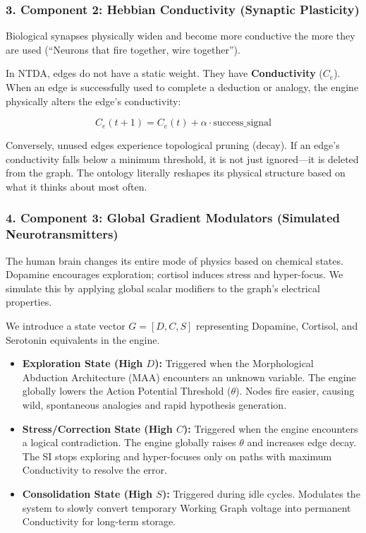 \documentclass[
  11pt,
  a4paper,
]{article}
\providecommand{\tightlist}{%
  \setlength{\itemsep}{0pt}\setlength{\parskip}{0pt}}
\begin{document}
\subsubsection{3. Component 2: Hebbian Conductivity (Synaptic
Plasticity)}\label{component-2-hebbian-conductivity-synaptic-plasticity}

Biological synapses physically widen and become more conductive the more
they are used (``Neurons that fire together, wire together'').

In NTDA, edges do not have a static weight. They have
\textbf{Conductivity} (\(C_{e}\)). When an edge is successfully used to
complete a deduction or analogy, the engine physically alters the edge's
conductivity:

\[ C_e(t+1) = C_e(t) + \alpha \cdot \text{success\_signal} \]

Conversely, unused edges experience topological pruning (decay). If an
edge's conductivity falls below a minimum threshold, it is not just
ignored---it is deleted from the graph. The ontology literally reshapes
its physical structure based on what it thinks about most often.

\subsubsection{4. Component 3: Global Gradient Modulators (Simulated
Neurotransmitters)}\label{component-3-global-gradient-modulators-simulated-neurotransmitters}

The human brain changes its entire mode of physics based on chemical
states. Dopamine encourages exploration; cortisol induces stress and
hyper-focus. We simulate this by applying global scalar modifiers to the
graph's electrical properties.

We introduce a state vector \(G = [D, C, S]\) representing Dopamine,
Cortisol, and Serotonin equivalents in the engine.

\begin{itemize}
\tightlist
\item
  \textbf{Exploration State (High \(D\)):} Triggered when the
  Morphological Abduction Architecture (MAA) encounters an unknown
  variable. The engine globally lowers the Action Potential Threshold
  (\(\theta\)). Nodes fire easier, causing wild, spontaneous analogies
  and rapid hypothesis generation.
\item
  \textbf{Stress/Correction State (High \(C\)):} Triggered when the
  engine encounters a logical contradiction. The engine globally raises
  \(\theta\) and increases edge decay. The SI stops exploring and
  hyper-focuses only on paths with maximum Conductivity to resolve the
  error.
\item
  \textbf{Consolidation State (High \(S\)):} Triggered during idle
  cycles. Modulates the system to slowly convert temporary Working Graph
  voltage into permanent Conductivity for long-term storage.
\end{itemize}
\end{document}
